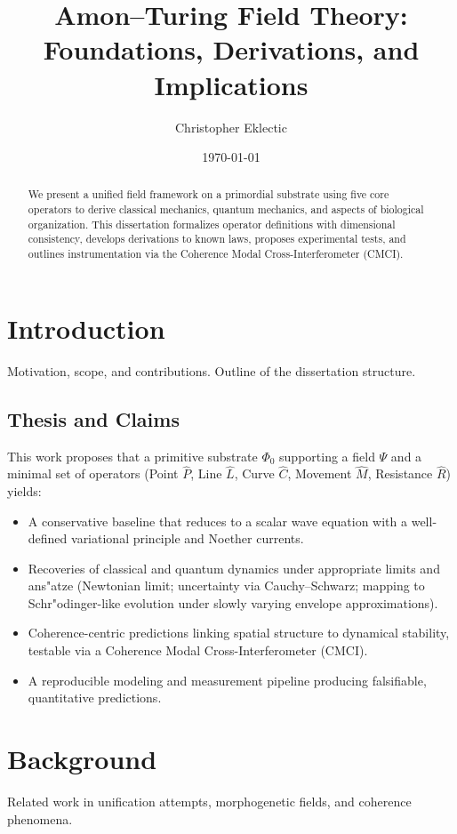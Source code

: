 \documentclass[12pt]{article}
\title{Amon--Turing Field Theory: Foundations, Derivations, and Implications}
\author{Christopher Eklectic}
\date{\today}
\begin{document}
\maketitle
\begin{abstract}
We present a unified field framework on a primordial substrate using five core operators to derive classical mechanics, quantum mechanics, and aspects of biological organization. This dissertation formalizes operator definitions with dimensional consistency, develops derivations to known laws, proposes experimental tests, and outlines instrumentation via the Coherence Modal Cross-Interferometer (CMCI).
\end{abstract}

\tableofcontents
\listoffigures
\listoftables

\section{Introduction}
Motivation, scope, and contributions. Outline of the dissertation structure.

\subsection{Thesis and Claims}
This work proposes that a primitive substrate $\Phi_0$ supporting a field $\Psi$ and a minimal set of operators (Point $\hat P$, Line $\hat L$, Curve $\hat C$, Movement $\hat M$, Resistance $\hat R$) yields:
\begin{itemize}
  \item A conservative baseline that reduces to a scalar wave equation with a well-defined variational principle and Noether currents.
  \item Recoveries of classical and quantum dynamics under appropriate limits and ans"atze (Newtonian limit; uncertainty via Cauchy--Schwarz; mapping to Schr"odinger-like evolution under slowly varying envelope approximations).
  \item Coherence-centric predictions linking spatial structure to dynamical stability, testable via a Coherence Modal Cross-Interferometer (CMCI).
  \item A reproducible modeling and measurement pipeline producing falsifiable, quantitative predictions.
\end{itemize}

\section{Background}
Related work in unification attempts, morphogenetic fields, and coherence phenomena.
\end{document}

